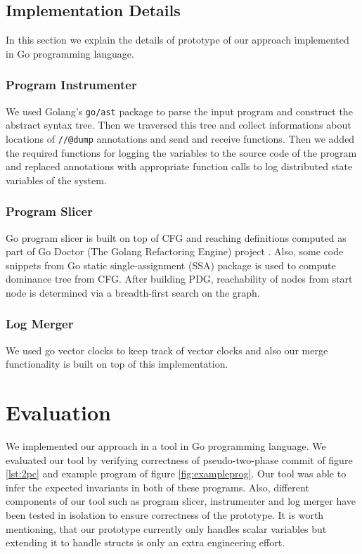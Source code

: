 \subsection{Implementation Details}

In this section we explain the details of prototype of our approach implemented in Go programming language.

\subsubsection{Program Instrumenter}

We used Golang's \texttt{go/ast} package to parse the input program and construct the abstract syntax tree. Then we traversed this tree and collect informations about locations of \texttt{//@dump} annotations and send and receive functions. Then we added the required functions for logging the variables to the source code of the program and replaced annotations with appropriate function calls to log distributed state variables of the system. 

\subsubsection{Program Slicer}

Go program slicer is built on top of CFG and reaching definitions computed as part of Go Doctor (The Golang Refactoring Engine) project \cite{godoctor}. Also, some code snippets from Go static single-assignment (SSA) package \cite{ssa} is used to compute dominance tree from CFG. After building PDG, reachability of nodes from start node is determined via a breadth-first search on the graph.

\subsubsection{Log Merger}

We used go vector clocks \cite{vclock} to keep track of vector clocks and also our merge functionality is built on top of this implementation. 


\section{Evaluation}
We implemented our approach in a tool in Go programming language. We evaluated our tool by verifying correctness of pseudo-two-phase commit of figure \ref{lst:2pc} and example program of figure \ref{fig:exampleprog}. Our tool was able to infer the expected invariants in both of these programs. Also, different components of our tool such as program slicer, instrumenter and log merger have been tested in isolation to ensure correctness of the prototype. It is worth mentioning, that our prototype currently only handles scalar variables but extending it to handle structs is only an extra engineering effort. %

